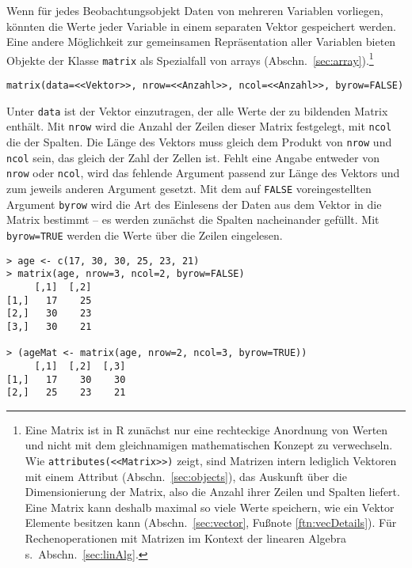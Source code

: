 Wenn für jedes Beobachtungsobjekt Daten von mehreren Variablen vorliegen, könnten die Werte jeder Variable in einem separaten Vektor gespeichert werden. Eine andere Möglichkeit zur gemeinsamen Repräsentation aller Variablen bieten Objekte der Klasse \lstinline!matrix! als Spezialfall von arrays (Abschn.\ \ref{sec:array}).\footnote{Eine Matrix ist in R zunächst nur eine rechteckige Anordnung von Werten und nicht mit dem gleichnamigen mathematischen Konzept zu verwechseln. Wie \lstinline!attributes(<<Matrix>>)! zeigt, sind Matrizen intern lediglich Vektoren mit einem Attribut (Abschn.\ \ref{sec:objects}), das Auskunft über die Dimensionierung der Matrix, also die Anzahl ihrer Zeilen und Spalten liefert. Eine Matrix kann deshalb maximal so viele Werte speichern, wie ein Vektor Elemente besitzen kann (Abschn.\ \ref{sec:vector}, Fußnote \ref{ftn:vecDetails}). Für Rechenoperationen mit Matrizen im Kontext der linearen Algebra s.\ Abschn.\ \ref{sec:linAlg}.}
\begin{lstlisting}
matrix(data=<<Vektor>>, nrow=<<Anzahl>>, ncol=<<Anzahl>>, byrow=FALSE)
\end{lstlisting}

Unter \lstinline!data! ist der Vektor einzutragen, der alle Werte der zu bildenden Matrix enthält. Mit \lstinline!nrow! wird die Anzahl der Zeilen dieser Matrix festgelegt, mit \lstinline!ncol! die der Spalten. Die Länge des Vektors muss gleich dem Produkt von \lstinline!nrow! und \lstinline!ncol! sein, das gleich der Zahl der Zellen ist. Fehlt eine Angabe entweder von \lstinline!nrow! oder \lstinline!ncol!, wird das fehlende Argument passend zur Länge des Vektors und zum jeweils anderen Argument gesetzt. Mit dem auf \lstinline!FALSE! voreingestellten Argument \lstinline!byrow! wird die Art des Einlesens der Daten aus dem Vektor in die Matrix bestimmt -- es werden zunächst die Spalten nacheinander gefüllt. Mit \lstinline!byrow=TRUE! werden die Werte über die Zeilen eingelesen.
\begin{lstlisting}
> age <- c(17, 30, 30, 25, 23, 21)
> matrix(age, nrow=3, ncol=2, byrow=FALSE)
     [,1]  [,2]
[1,]   17    25
[2,]   30    23
[3,]   30    21

> (ageMat <- matrix(age, nrow=2, ncol=3, byrow=TRUE))
     [,1]  [,2]  [,3]
[1,]   17    30    30
[2,]   25    23    21
\end{lstlisting}

